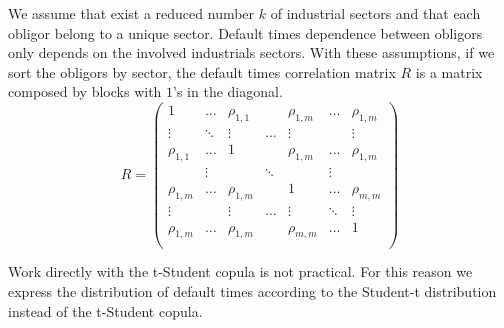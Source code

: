 \documentclass[11pt,fleqn]{book} %
\begin{document}
We assume that exist a reduced number $k$ of industrial sectors and that
each obligor belong to a unique sector. Default times dependence between 
obligors only depends on the involved industrials sectors. With these
assumptions, if we sort the obligors by sector, the default times
correlation matrix $R$ is a matrix composed by blocks with $1$'s in the 
diagonal.
\begin{displaymath}
	R =
	\left(
	\begin{array}{ccccccc}
		1          & \dots  & \rho_{1,1} &        & \rho_{1,m} & \dots  & \rho_{1,m} \\
		\vdots     & \ddots & \vdots     & \dots  & \vdots     &        & \vdots     \\
		\rho_{1,1} & \dots  & 1          &        & \rho_{1,m} & \dots  & \rho_{1,m} \\
		
		           & \vdots &            & \ddots &            & \vdots &            \\
		
		\rho_{1,m} & \dots  & \rho_{1,m} &        & 1          & \dots  & \rho_{m,m} \\
		\vdots     &        & \vdots     & \dots  & \vdots     & \ddots & \vdots     \\
		\rho_{1,m} & \dots  & \rho_{1,m} &        & \rho_{m,m} & \dots  & 1          \\
	\end{array}
	\right)
\end{displaymath}

Work directly with the t-Student copula is not practical. For this reason 
we express the distribution of default times according to the Student-t 
distribution instead of the t-Student copula.
\end{document}
